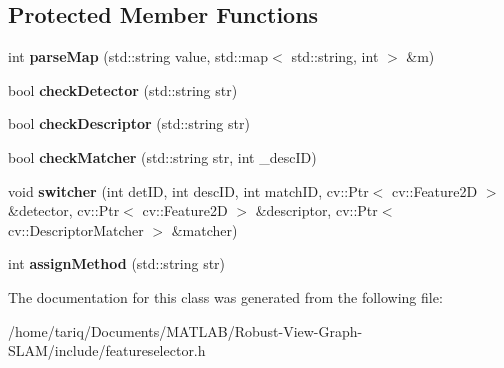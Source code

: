 \subsection*{Protected Member Functions}
\begin{DoxyCompactItemize}
\item 
int {\bfseries parse\+Map} (std\+::string value, std\+::map$<$ std\+::string, int $>$ \&m)\hypertarget{classFeatureSelector_a661d1a367c3b88a89ce0efe094baa64a}{}\label{classFeatureSelector_a661d1a367c3b88a89ce0efe094baa64a}

\item 
bool {\bfseries check\+Detector} (std\+::string str)\hypertarget{classFeatureSelector_a037cb04383dd308effd3f7605ac6a3c8}{}\label{classFeatureSelector_a037cb04383dd308effd3f7605ac6a3c8}

\item 
bool {\bfseries check\+Descriptor} (std\+::string str)\hypertarget{classFeatureSelector_a2913a660c607fd69bfdac130c5812ace}{}\label{classFeatureSelector_a2913a660c607fd69bfdac130c5812ace}

\item 
bool {\bfseries check\+Matcher} (std\+::string str, int \+\_\+desc\+ID)\hypertarget{classFeatureSelector_a40d109b2f6774cacb21a96f4dfb13af4}{}\label{classFeatureSelector_a40d109b2f6774cacb21a96f4dfb13af4}

\item 
void {\bfseries switcher} (int det\+ID, int desc\+ID, int match\+ID, cv\+::\+Ptr$<$ cv\+::\+Feature2D $>$ \&detector, cv\+::\+Ptr$<$ cv\+::\+Feature2D $>$ \&descriptor, cv\+::\+Ptr$<$ cv\+::\+Descriptor\+Matcher $>$ \&matcher)\hypertarget{classFeatureSelector_a20d8aa21ec7d99cffde7af05cee5bcbc}{}\label{classFeatureSelector_a20d8aa21ec7d99cffde7af05cee5bcbc}

\item 
int {\bfseries assign\+Method} (std\+::string str)\hypertarget{classFeatureSelector_aaa6c7cbea4869d53b44ef785d78d5063}{}\label{classFeatureSelector_aaa6c7cbea4869d53b44ef785d78d5063}

\end{DoxyCompactItemize}


The documentation for this class was generated from the following file\+:\begin{DoxyCompactItemize}
\item 
/home/tariq/\+Documents/\+M\+A\+T\+L\+A\+B/\+Robust-\/\+View-\/\+Graph-\/\+S\+L\+A\+M/include/featureselector.\+h\end{DoxyCompactItemize}

